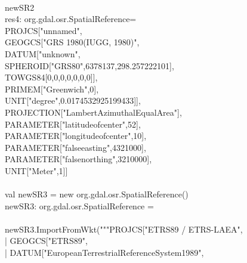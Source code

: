 \documentclass {article}
\begin{document}
\\
newSR2 \\
res4: org.gdal.osr.SpatialReference= \\
PROJCS["unnamed", \\
\hspace*{2mm} GEOGCS["GRS 1980(IUGG, 1980)", \\
\hspace*{4mm} DATUM["unknown", \\
\hspace*{6mm} SPHEROID["GRS80",6378137,298.257222101],\\
\hspace*{6mm} TOWGS84[0,0,0,0,0,0,0]], \\
\hspace*{4mm} PRIMEM["Greenwich",0], \\
\hspace*{4mm} UNIT["degree",0.0174532925199433]],\\
\hspace*{2mm} PROJECTION["Lambert\underline{\space}Azimuthal\underline{\space}Equal\underline{\space}Area"],\\
\hspace*{2mm} PARAMETER["latitude\underline{\space}of\underline{\space}center",52],\\
\hspace*{2mm} PARAMETER["longitude\underline{\space}of\underline{\space}center",10],\\
\hspace*{2mm} PARAMETER["false\underline{\space}easting",4321000],\\
\hspace*{2mm} PARAMETER["false\underline{\space}northing",3210000],\\
\hspace*{2mm} UNIT["Meter",1]]\\
\\
val newSR3 = new org.gdal.osr.SpatialReference() \\
newSR3: org.gdal.osr.SpatialReference = \\
\\
newSR3.ImportFromWkt("""PROJCS["ETRS89 / ETRS-LAEA",\\
     |    \hspace*{4mm} GEOGCS["ETRS89", \\
     |    \hspace*{6mm} DATUM["European\underline{\space}Terrestrial\underline{\space}Reference\underline{\space}System\underline{\space}1989",\\
\end{document}
